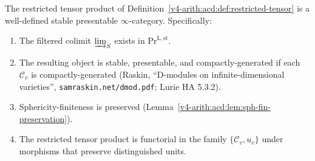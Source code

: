 \begin{theorem}[\((L_{1})\) closed]
\label{v4-arith:acd:thm:L1-closed}
The restricted tensor product of
Definition~\ref{v4-arith:acd:def:restricted-tensor} is a well-defined stable
presentable \(\infty\)-category. Specifically:
\begin{enumerate}
\item The filtered colimit \(\varinjlim_{S}\) exists in
\(\mathrm{Pr}^{\mathrm{L,st}}\).
\item The resulting object is stable, presentable, and
compactly-generated if each \(\mathcal{C}_{v}\) is compactly-generated
(Raskin, ``D-modules on infinite-dimensional varieties'',
\texttt{samraskin.net/dmod.pdf}; Lurie HA 5.3.2).
\item Sphericity-finiteness is preserved
(Lemma~\ref{v4-arith:acd:lem:sph-fin-preservation}).
\item The restricted tensor product is functorial in the family
\(\{\mathcal{C}_{v}, u_{v}\}\) under morphisms that preserve
distinguished units.
\end{enumerate}
\end{theorem}

